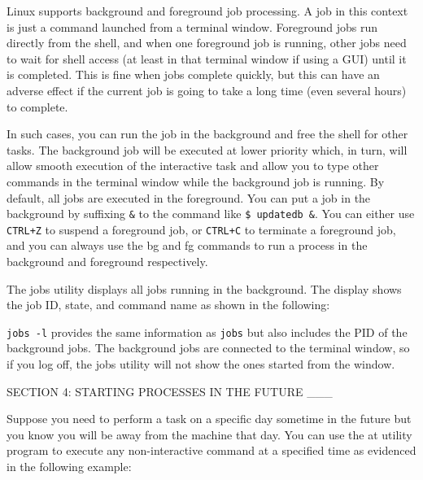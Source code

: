 Linux supports background and foreground job processing. A job in this
context is just a command launched from a terminal window. Foreground
jobs run directly from the shell, and when one foreground job is
running, other jobs need to wait for shell access (at least in that
terminal window if using a GUI) until it is completed. This is fine when
jobs complete quickly, but this can have an adverse effect if the
current job is going to take a long time (even several hours) to
complete.

In such cases, you can run the job in the background and free the shell
for other tasks. The background job will be executed at lower priority
which, in turn, will allow smooth execution of the interactive task and
allow you to type other commands in the terminal window while the
background job is running. By default, all jobs are executed in the
foreground. You can put a job in the background by suffixing \texttt{\&}
to the command like \texttt{\$ updatedb \&}. You can either use
\texttt{CTRL+Z} to suspend a foreground job, or \texttt{CTRL+C} to
terminate a foreground job, and you can always use the bg and fg
commands to run a process in the background and foreground respectively.

The jobs utility displays all jobs running in the background. The
display shows the job ID, state, and command name as shown in the
following:

\begin{Shaded}
\begin{Highlighting}[]
\NormalTok{$ }
\NormalTok{[}\NormalTok{]- Stopped      sleep 100}
\NormalTok{[}\NormalTok{]+ Stopped      sleep 100}
\NormalTok{$ } 
\NormalTok{[}\NormalTok{]- 23375 Stopped      sleep 100}
\NormalTok{[}\NormalTok{]+ 23392 Stopped      sleep 100}
\end{Highlighting}
\end{Shaded}

\texttt{jobs -l} provides the same information as \texttt{jobs} but also
includes the PID of the background jobs. The background jobs are
connected to the terminal window, so if you log off, the jobs utility
will not show the ones started from the window.

SECTION 4: STARTING PROCESSES IN THE FUTURE \_\_\_

Suppose you need to perform a task on a specific day sometime in the
future but you know you will be away from the machine that day. You can
use the at utility program to execute any non-interactive command at a
specified time as evidenced in the following example:


